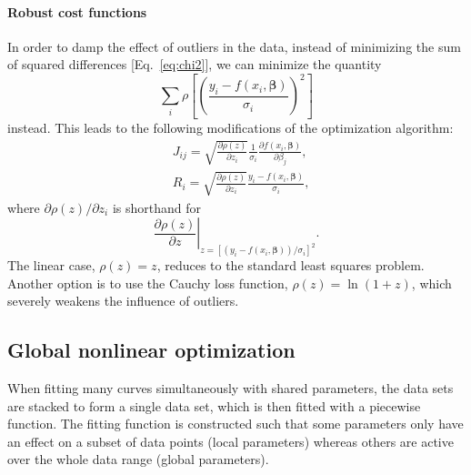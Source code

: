 \documentclass{article}
\begin{document}
\paragraph{Robust cost functions} In order to damp the effect of outliers in the data, instead of minimizing the sum of squared differences [Eq.~\eqref{eq:chi2}], we can minimize the quantity
\begin{equation}
  \sum_i \rho\left[ \left(\frac{y_i - f(x_i, \bm\beta)}{\sigma_i}\right)^2 \right]
\end{equation}
instead. This leads to the following modifications of the optimization algorithm:
\begin{equation}
  \begin{split}
    & J_{ij} = \sqrt{\frac{\partial\rho(z)}{\partial z_i}} \frac{1}{\sigma_i} \frac{\partial f(x_i, \bm \beta)} {\partial \beta_j}, \\
    & R_i = \sqrt{\frac{\partial\rho(z)}{\partial z_i}} \frac{y_i - f(x_i,\bm \beta)}{\sigma_i},
  \end{split}
\end{equation}
where $\partial\rho(z)/\partial z_i$ is shorthand for
\begin{equation*}
  \left.
    \frac{\partial\rho(z)}{\partial z}
  \right|_{z = [(y_i - f(x_i,\bm \beta))/\sigma_i]^2}.
\end{equation*}
The linear case, $\rho(z) = z$, reduces to the standard least squares problem. Another option is to use the Cauchy loss function, $\rho(z) = \ln(1+z)$, which severely weakens the influence of outliers.

\subsection{Global nonlinear optimization}

When fitting many curves simultaneously with shared parameters, the data sets are stacked to form a single data set, which is then fitted with a piecewise function. The fitting function is constructed such that some parameters only have an effect on a subset of data points (local parameters) whereas others are active over the whole data range (global parameters).
\end{document}
